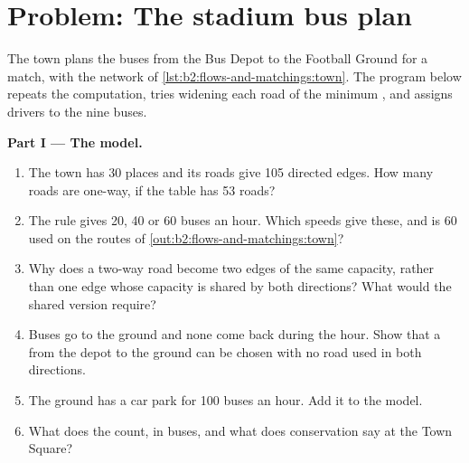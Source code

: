 \section{Problem: The stadium bus plan}\label{sec:b2:flows-and-matchings:problem}

\begin{problem}\label{pb:b2:flows-and-matchings:1}
The town plans the buses from the Bus Depot to the Football Ground for a match, with the network of
\cref{lst:b2:flows-and-matchings:town}. The program below repeats the computation, tries widening each road of the
minimum , and assigns drivers to the nine buses.

\label{lst:b2:flows-and-matchings:bus-plan}

\label{out:b2:flows-and-matchings:problem}

\medskip\noindent\textbf{Part I --- The model.}\par\nopagebreak
\begin{enumerate}
\item The town has 30 places and its roads give 105 directed edges. How many roads are one-way, if the table has 53
roads?
\item The rule gives 20, 40 or 60 buses an hour. Which speeds give these, and is 60 used on the routes of
\cref{out:b2:flows-and-matchings:town}?
\item Why does a two-way road become two edges of the same capacity, rather than one edge whose capacity is shared by both
directions? What would the shared version require?
\item Buses go to the ground and none come back during the hour. Show that a  from the depot to the ground can be
chosen with no road used in both directions.
\item The ground has a car park for 100 buses an hour. Add it to the model.
\item What does the  count, in buses, and what does conservation say at the Town Square?
\end{enumerate}


\end{problem}
